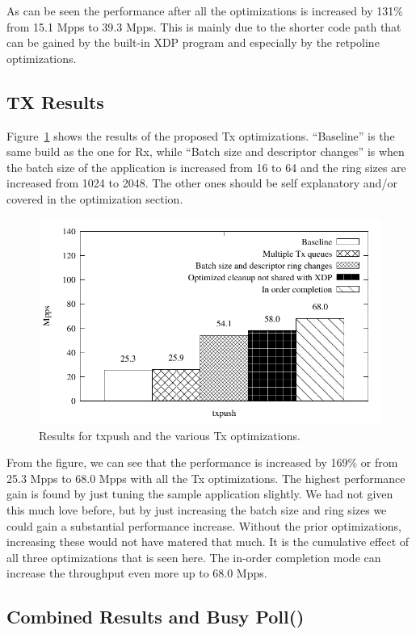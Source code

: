 \documentclass[9pt,numbers,reprint]{sigplanconf}
\begin{document}
As can be seen the performance after all the optimizations is
increased by 131\% from 15.1 Mpps to 39.3 Mpps. This is mainly due to
the shorter code path that can be gained by the built-in XDP program
and especially by the retpoline optimizations.


\subsection{TX Results}
\label{sec:exp:txres}

Figure~\ref{fig:results_tx} shows the results of the proposed Tx
optimizations. ``Baseline'' is the same build as the one for Rx,
while ``Batch size and descriptor changes'' is when the batch
size of the application is increased from 16 to 64 and the ring sizes
are increased from 1024 to 2048. The other ones should be self
explanatory and/or covered in the optimization section.

\begin{figure}[ht]
\centering
\includegraphics[width=.5\textwidth]{results_tx.pdf}
\caption{Results for txpush and the various Tx optimizations.}
\label{fig:results_tx}
\end{figure}

From the figure, we can see that the performance is increased by 169\%
or from 25.3 Mpps to 68.0 Mpps with all the Tx optimizations. The highest
performance gain is found by just tuning the sample application
slightly. We had not given this much love before, but by just
increasing the batch size and ring sizes we could gain a substantial
performance increase. Without the prior optimizations, increasing
these would not have matered that much. It is the cumulative effect of all
three optimizations that is seen here. The in-order completion mode
can increase the throughput even more up to 68.0 Mpps.


\subsection{Combined Results and Busy Poll()}
\label{sec:exp:combres}
\end{document}
